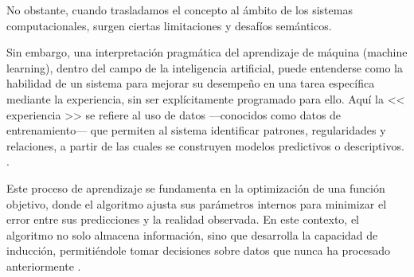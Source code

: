 \documentclass[12pt]{article}
\begin{document}
No obstante, cuando trasladamos el concepto al ámbito de los sistemas computacionales, surgen ciertas limitaciones y desafíos semánticos.

Sin embargo, una interpretación pragmática del aprendizaje de máquina (machine learning), dentro del campo de la inteligencia artificial, puede entenderse como la habilidad de un sistema para mejorar su desempeño en una tarea específica mediante la experiencia, sin ser explícitamente programado para ello.
Aquí la << experiencia >> se refiere al uso de datos —conocidos como datos de entrenamiento— que permiten al sistema identificar patrones, regularidades y relaciones, a partir de las cuales se construyen modelos predictivos o descriptivos.
\cite{De0a100enIA}.

Este proceso de aprendizaje se fundamenta en la optimización de una función objetivo, donde el algoritmo ajusta sus parámetros internos para minimizar el error entre sus predicciones y la realidad observada. En este contexto, el algoritmo no solo almacena información, sino que desarrolla la capacidad de inducción, permitiéndole tomar decisiones sobre datos que nunca ha procesado anteriormente \cite{bishop2006pattern}.
\end{document}
